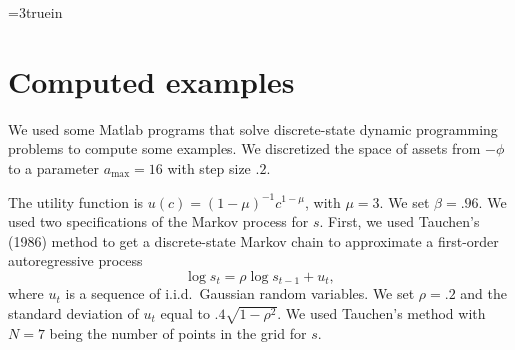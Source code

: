 
\centerline{\epsfxsize=3truein}
\caption{Two $Ea(r)$ curves, one with $b=6$, the other with $b=3$, with $w$ fixed
at $w=1$. Notice that at $r=0$, the difference between the two curves is $3$, the
difference in the $b$'s.}
\endfigure

%
%
%


\section{Computed examples}

  We used some Matlab programs that solve
 discrete-state dynamic programming problems to compute some
examples.
We discretized the space  of assets from $-\phi$ to
a parameter $a_{\max} =16$ with step size $.2$.

 The utility function is $u(c) =(1- \mu)^{-1} c^{1-\mu}$, with $\mu =3$.
We set $\beta=.96$. We used two specifications of the Markov
process for $s$.  First, we used Tauchen's (1986) method to
get a discrete-state Markov chain to approximate a first-order
autoregressive process
$$ \log s_t =  \rho \log s_{t-1} + u_t, $$
where $u_t$ is a sequence of  i.i.d.\ Gaussian  random variables.
We set $\rho =.2$ and the standard deviation of $u_t$ equal
to $.4 \sqrt{1-\rho^2}$.  We used Tauchen's method with
$N=7$ being the number of points in the grid for $s$.

